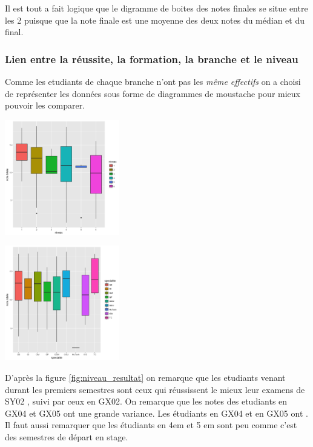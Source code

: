 \documentclass[10pt]{article}
\begin{document}
Il est tout a fait logique que le digramme de boites des notes finales se situe entre les 2 puisque que la note finale est une moyenne des deux notes du médian et du final.
 
	
\subsubsection{Lien entre la réussite, la formation, la branche et le niveau}
Comme les etudiants de chaque branche n'ont pas les \textit{même effectifs} on a choisi de représenter les données sous forme de diagrammes de moustache pour mieux pouvoir les comparer.\\


	\begin{minipage}{.5\textwidth}
		\includegraphics[width=50mm]{Figures/Notes/niveau_resultat.png}
		\label{fig:niveau_resultat}
	\end{minipage}%
	\hspace{0.08\linewidth}
	\begin{minipage}{.5\textwidth}
		\includegraphics[width=50mm]{Figures/Notes/specialite_resultat.png}
		\label{fig:specialite_resultat}
	\end{minipage}
D'après la figure \ref{fig:niveau_resultat} on remarque que les etudiants venant durant les premiers semestres sont ceux qui réussissent le mieux leur examens de SY02 , suivi par ceux en GX02. On remarque que les notes des etudiants en GX04 et GX05 ont une grande variance. Les étudiants en GX04 et en GX05 ont . Il faut aussi remarquer que les étudiants en 4em et 5 em sont peu comme c'est des semestres de départ en stage. \\
\end{document}

